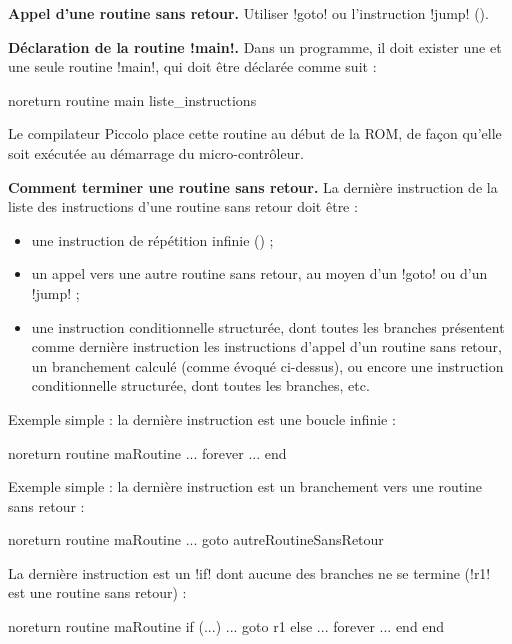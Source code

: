 \textbf{Appel d’une routine sans retour.} Utiliser \pic!goto! ou l'instruction \pic!jump! ().


\textbf{Déclaration de la routine \pic!main!.} Dans un programme, il doit exister une et une seule routine \pic!main!, qui doit être déclarée comme suit :

\begin{piccolo}
noreturn routine main {
   liste_instructions
}

\end{piccolo}

Le compilateur Piccolo place cette routine au début de la ROM, de façon qu'elle soit exécutée au démarrage du micro-contrôleur.


\textbf{Comment terminer une routine sans retour.} La dernière instruction de la liste des instructions d’une routine sans retour doit être :
\begin{itemize}
  \item une instruction de répétition infinie () ;
  \item un appel vers une autre routine sans retour, au moyen d’un \pic!goto! ou d'un \pic!jump! ;
  \item une instruction conditionnelle structurée, dont toutes les branches présentent comme dernière instruction les instructions d’appel d’un routine sans retour, un branchement calculé (comme évoqué ci-dessus), ou encore une instruction conditionnelle structurée, dont toutes les branches, etc.

\end{itemize}

Exemple simple : la dernière instruction est une boucle infinie :
\begin{piccolo}
noreturn routine maRoutine {
  ...
  forever
    ...
  end
}
\end{piccolo}

Exemple simple : la dernière instruction est un branchement vers une routine sans retour :
\begin{piccolo}
noreturn routine maRoutine {
  ...
  goto autreRoutineSansRetour
}
\end{piccolo}


La dernière instruction est un \pic!if! dont aucune des branches ne se termine (\pic!r1! est une routine sans retour) :
\begin{piccolo}
noreturn routine maRoutine {
  if (...)
    ...
    goto r1
  else
    ...
    forever
      ...
    end
  end
}

\end{piccolo}


